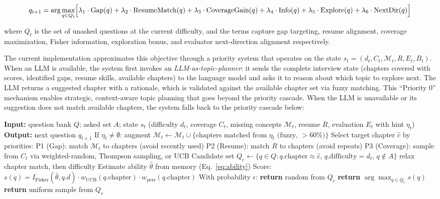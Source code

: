 ﻿\documentclass[final,3p,times,authoryear]{elsarticle}
\begin{document}
\begin{equation}
q_{t+1} = \arg\max_{q \in Q_t} \Bigl[\lambda_1 \cdot \text{Gap}(q) + \lambda_2 \cdot \text{ResumeMatch}(q) + \lambda_3 \cdot \text{CoverageGain}(q) + \lambda_4 \cdot \text{Info}(q) + \lambda_5 \cdot \text{Explore}(q) + \lambda_6 \cdot \text{NextDir}(q)\Bigr]
\label{eq:selection_objective}
\end{equation}

where $Q_t$ is the set of unasked questions at the current difficulty, and the terms capture gap targeting, resume alignment, coverage maximization, Fisher information, exploration bonus, and evaluator next-direction alignment respectively.

The current implementation approximates this objective through a priority system that operates on the state $s_t = (d_t, C_t, \mathcal{M}_t, R, E_t, B_t)$. When an LLM is available, the system first invokes an \emph{LLM-as-topic-planner}: it sends the complete interview state (chapters covered with scores, identified gaps, resume skills, available chapters) to the language model and asks it to reason about which topic to explore next. The LLM returns a suggested chapter with a rationale, which is validated against the available chapter set via fuzzy matching. This ``Priority 0'' mechanism enables strategic, context-aware topic planning that goes beyond the priority cascade. When the LLM is unavailable or its suggestion does not match available chapters, the system falls back to the priority cascade below:

\begin{algorithm}[h]
\caption{State-Aware Multi-Objective Question Selection}
\label{alg:rq2}
\begin{algorithmic}[1]
\STATE \textbf{Input:} question bank $Q$; asked set $A$; state $s_t$ (difficulty $d_t$, coverage $C_t$, missing concepts $\mathcal{M}_t$, resume $R$, evaluation $E_t$ with hint $\eta_t$)
\STATE \textbf{Output:} next question $q_{t+1}$
\STATE If $\eta_t \neq \emptyset$: augment $\mathcal{M}_t \leftarrow \mathcal{M}_t \cup \{\text{chapters matched from } \eta_t \text{ (fuzzy, $>60\%$)}\}$
\STATE Select target chapter $\hat{c}$ by priorities:
\STATE \quad P1 (Gap): match $\mathcal{M}_t$ to chapters (avoid recently used)
\STATE \quad P2 (Resume): match $R$ to chapters (avoid repeats)
\STATE \quad P3 (Coverage): sample from $C_t$ via weighted-random, Thompson sampling, or UCB
\STATE Candidate set $Q_c \leftarrow \{q \in Q : q.\text{chapter} \approx \hat{c},\, q.\text{difficulty} = d_t,\, q \notin A\}$
 \STATE relax chapter match, then difficulty \ENDIF
{}
    \STATE Estimate ability $\hat{\theta}$ from memory (Eq.~\ref{eq:ability})
    \STATE Score: $s(q) = I_{\text{Fisher}}(\hat{\theta}, q.d) \cdot w_{\text{UCB}}(q.\text{chapter}) \cdot w_{\text{pers}}(q.\text{chapter})$
    \STATE With probability $\epsilon$: \textbf{return} random from $Q_c$
    \STATE \textbf{return} $\arg\max_{q \in Q_c} s(q)$
\ELSE
    \STATE \textbf{return} uniform sample from $Q_c$
\ENDIF
\end{algorithmic}
\end{algorithm}
\end{document}

